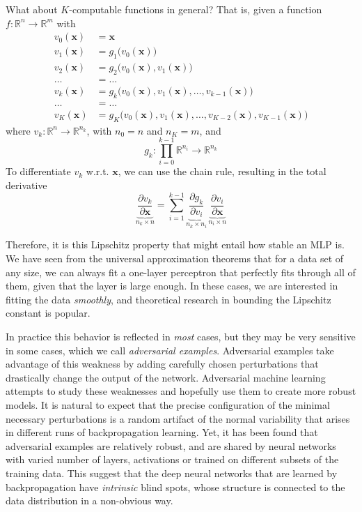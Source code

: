 \documentclass{article}
\begin{document}
  What about $K$-computable functions in general? That is, given a function $f: \mathbb{R}^n \longrightarrow \mathbb{R}^m$ with 
  \begin{align}
    v_0 (\mathbf{x}) & = \mathbf{x} \\ 
    v_1 (\mathbf{x}) & = g_1 \big(v_0(\mathbf{x}) \big) \\
    v_2 (\mathbf{x}) & = g_2 \big(v_0(\mathbf{x}), v_1 (\mathbf{x}) \big) \\ 
    \ldots & = \ldots \\
    v_k (\mathbf{x}) & = g_k \big(v_0 (\mathbf{x}), v_1(\mathbf{x}), \ldots, v_{k-1} (\mathbf{x}) \big) \\
    \ldots & = \ldots \\
    v_K (\mathbf{x}) & = g_K \big(v_0(\mathbf{x}), v_1 (\mathbf{x}), \ldots, v_{K-2}(\mathbf{x}), v_{K-1}(\mathbf{x}) \big)
  \end{align}
  where $v_k: \mathbb{R}^n \longrightarrow \mathbb{R}^{n_k}$, with $n_0 = n$ and $n_K = m$, and 
  \begin{equation}
    g_k : \prod_{i=0}^{k-1} \mathbb{R}^{n_i} \longrightarrow \mathbb{R}^{n_k}
  \end{equation}
  To differentiate $v_k$ w.r.t. $\mathbf{x}$, we can use the chain rule, resulting in the total derivative 
  \begin{equation}
    \underbrace{\frac{\partial v_k}{\partial \mathbf{x}}}_{n_k \times n} = \sum_{i=1}^{k-1} \underbrace{\frac{\partial g_k}{\partial v_i}}_{n_k \times n_i} \, \underbrace{\frac{\partial v_i}{\partial \mathbf{x}}}_{n_i \times n}
  \end{equation}

  Therefore, it is this Lipschitz property that might entail how stable an MLP is. We have seen from the universal approximation theorems that for a data set of any size, we can always fit a one-layer perceptron that perfectly fits through all of them, given that the layer is large enough. In these cases, we are interested in fitting the data \textit{smoothly}, and theoretical research in bounding the Lipschitz constant is popular.

  In practice this behavior is reflected in \textit{most} cases, but they may be very sensitive in some cases, which we call \textit{adversarial examples}. Adversarial examples take advantage of this weakness by adding carefully chosen perturbations that drastically change the output of the network. Adversarial machine learning attempts to study these weaknesses and hopefully use them to create more robust models. It is natural to expect that the precise configuration of the minimal necessary perturbations is a random artifact of the normal variability that arises in different runs of backpropagation learning. Yet, it has been found that adversarial examples are relatively robust, and are shared by neural networks with varied number of layers, activations or trained on different subsets of the training data. This suggest that the deep neural networks that are learned by backpropagation have \textit{intrinsic} blind spots, whose structure is connected to the data distribution in a non-obvious way. 
\end{document}
